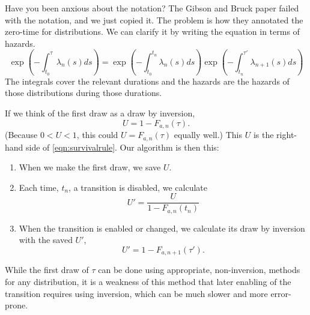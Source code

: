 \documentclass{article}
\begin{document}
Have you been anxious about the notation? The Gibson and Bruck paper failed with the notation, and we just copied it. The problem is how they annotated the zero-time for distributions. We can clarify it by writing the equation in terms of hazards.
\begin{equation}
	\exp\left(-\int_{t_0}^{\tau}\lambda_n(s)ds\right) = \exp\left(-\int_{t_0}^{t_n}\lambda_n(s)ds\right)\exp\left(-\int_{t_n}^{\tau'}\lambda_{n+1}(s)ds\right)
\end{equation}
The integrals cover the relevant durations and the hazards are the hazards of those distributions during those durations.

If we think of the first draw as a draw by inversion,
\begin{equation}
	U = 1-F_{a,n}(\tau).
\end{equation}
(Because $0<U<1$, this could $U=F_{a,n}(\tau)$ equally well.) This $U$ is the right-hand side of \ref{eqn:survivalrule}. Our algorithm is then this:

\begin{enumerate}
	\item When we make the first draw, we save $U$.
	\item Each time, $t_n$, a transition is disabled, we calculate
		\begin{equation}
			U'=\frac{U}{1-F_{a,n}(t_n)}
		\end{equation}
	\item When the transition is enabled or changed, we calculate its draw by inversion with the saved $U'$,
	\begin{equation}
		U'=1-F_{a,n+1}(\tau').
	\end{equation}
\end{enumerate}
While the first draw of $\tau$ can be done using appropriate, non-inversion, methods for any distribution, it is a weakness of this method that later enabling of the transition requires using inversion, which can be much slower and more error-prone.
\end{document}
